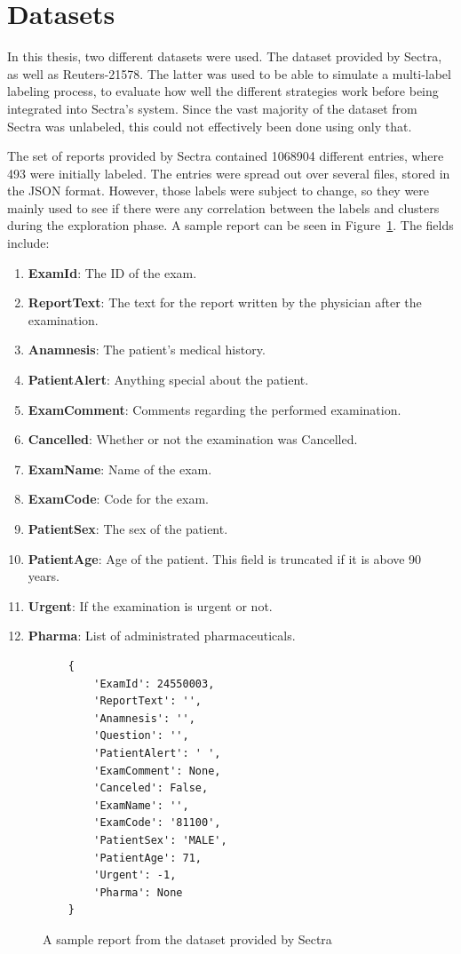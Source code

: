 \section{Datasets}\label{sec:datasets}
In this thesis, two different datasets were used.
The dataset provided by Sectra, as well as Reuters-21578.
The latter was used to be able to simulate a multi-label labeling process, to evaluate how well the different strategies work before being integrated into Sectra's system.
Since the vast majority of the dataset from Sectra was unlabeled, this could not effectively been done using only that.

The set of reports provided by Sectra contained 1068904 different entries, where 493 were initially labeled.
The entries were spread out over several files, stored in the JSON format.
However, those labels were subject to change, so they were mainly used to see if there were any correlation between the labels and clusters during the exploration phase.
A sample report can be seen in Figure~\ref{fig:sample-report}.
The fields include:
\begin{enumerate}
    \item \textbf{ExamId}: The ID of the exam.
    \item \textbf{ReportText}: The text for the report written by the physician after the examination.
    \item \textbf{Anamnesis}: The patient's medical history.
    \item \textbf{PatientAlert}: Anything special about the patient.
    \item \textbf{ExamComment}: Comments regarding the performed examination.
    \item \textbf{Cancelled}: Whether or not the examination was Cancelled.
    \item \textbf{ExamName}: Name of the exam.
    \item \textbf{ExamCode}: Code for the exam.
    \item \textbf{PatientSex}: The sex of the patient.
    \item \textbf{PatientAge}: Age of the patient. This field is truncated if it is above 90 years.
    \item \textbf{Urgent}: If the examination is urgent or not.
    \item \textbf{Pharma}: List of administrated pharmaceuticals.
\end{enumerate}
\begin{figure}
\begin{verbatim}
    {
        'ExamId': 24550003, 
        'ReportText': '',
        'Anamnesis': '',
        'Question': '',
        'PatientAlert': ' ', 
        'ExamComment': None, 
        'Canceled': False, 
        'ExamName': '',
        'ExamCode': '81100', 
        'PatientSex': 'MALE', 
        'PatientAge': 71, 
        'Urgent': -1, 
        'Pharma': None
    }
\end{verbatim}
\caption{A sample report from the dataset provided by Sectra}
\label{fig:sample-report}
\end{figure}

